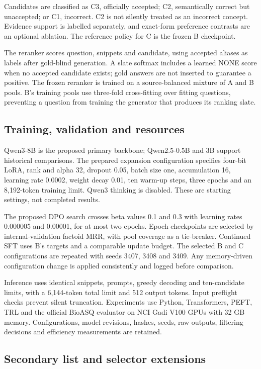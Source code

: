 \documentclass[12pt,a4paper]{article}
\begin{document}
Candidates are classified as C3, officially accepted; C2, semantically correct but unaccepted; or C1, incorrect. C2 is not silently treated as an incorrect concept. Evidence support is labelled separately, and exact-form preference contrasts are an optional ablation. The reference policy for C is the frozen B checkpoint.

The reranker scores question, snippets and candidate, using accepted aliases as labels after gold-blind generation. A slate softmax includes a learned NONE score when no accepted candidate exists; gold answers are not inserted to guarantee a positive. The frozen reranker is trained on a source-balanced mixture of A and B pools. B's training pools use three-fold cross-fitting over fitting questions, preventing a question from training the generator that produces its ranking slate.

\subsection{Training, validation and resources}

Qwen3-8B is the proposed primary backbone; Qwen2.5-0.5B and 3B support historical comparisons. The prepared expansion configuration specifies four-bit LoRA, rank and alpha 32, dropout 0.05, batch size one, accumulation 16, learning rate 0.0002, weight decay 0.01, ten warm-up steps, three epochs and an 8,192-token training limit. Qwen3 thinking is disabled. These are starting settings, not completed results.

The proposed DPO search crosses beta values 0.1 and 0.3 with learning rates 0.000005 and 0.00001, for at most two epochs. Epoch checkpoints are selected by internal-validation factoid MRR, with pool coverage as a tie-breaker. Continued SFT uses B's targets and a comparable update budget. The selected B and C configurations are repeated with seeds 3407, 3408 and 3409. Any memory-driven configuration change is applied consistently and logged before comparison.

Inference uses identical snippets, prompts, greedy decoding and ten-candidate limits, with a 6,144-token total limit and 512 output tokens. Input preflight checks prevent silent truncation. Experiments use Python, Transformers, PEFT, TRL and the official BioASQ evaluator on NCI Gadi V100 GPUs with 32 GB memory. Configurations, model revisions, hashes, seeds, raw outputs, filtering decisions and efficiency measurements are retained.

\subsection{Secondary list and selector extensions}
\end{document}
